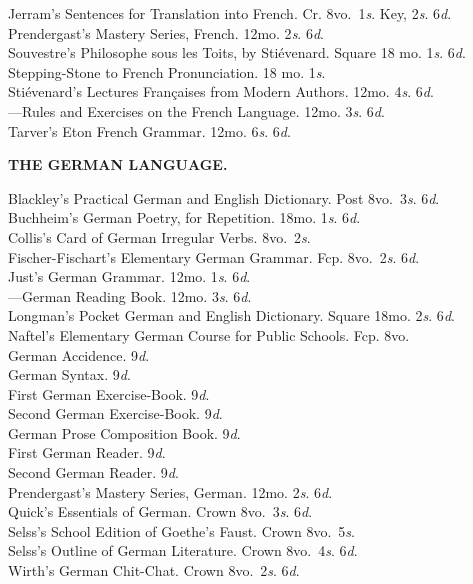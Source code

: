 \documentclass[letterpaper,12pt,oneside,openany]{memoir}
\newcommand{\D}{\hspace*{5mm}}
\newcommand{\E}{\hspace*{2mm}---\hspace*{2mm}}
\begin{document}
\begin{footnotesize}
Jerram's Sentences for Translation into French. Cr. 8vo.\ 1\textit{s}. Key, 2\textit{s}. 6\textit{d}.\\
Prendergast's Mastery Series, French. 12mo. 2\textit{s}. 6\textit{d}.\\
Souvestre's Philosophe sous les Toits, by Sti{\'e}venard. Square 18 mo. 1\textit{s}. 6\textit{d}.\\
Stepping-Stone to French Pronunciation. 18 mo. 1\textit{s}.\\
Sti{\'e}venard's Lectures Fran{\c c}aises from Modern Authors. 12mo. 4\textit{s}. 6\textit{d}.\\
\E Rules and Exercises on the French Language. 12mo. 3\textit{s}. 6\textit{d}.\\
Tarver's Eton French Grammar. 12mo. 6\textit{s}. 6\textit{d}.
\begin{center}
\textbf{THE GERMAN LANGUAGE.}
\end{center}
\raggedbottom
Blackley's Practical German and English Dictionary. Post 8vo.\ 3\textit{s}. 6\textit{d}.\\
Buchheim's German Poetry, for Repetition. 18mo. 1\textit{s}. 6\textit{d}.\\
Collis's Card of German Irregular Verbs. 8vo.\ 2\textit{s}.\\
Fischer-Fischart's Elementary German Grammar. Fcp. 8vo.\ 2\textit{s}. 6\textit{d}.\\
Just's German Grammar. 12mo. 1\textit{s}. 6\textit{d}.\\
\E German Reading Book. 12mo. 3\textit{s}. 6\textit{d}.\\
Longman's Pocket German and English Dictionary. Square 18mo. 2\textit{s}. 6\textit{d}.\\
Naftel's Elementary German Course for Public Schools. Fcp. 8vo.\\
\D German Accidence. 9\textit{d}.\\
\D German Syntax. 9\textit{d}.\\
\D First German Exercise-Book. 9\textit{d}.\\
\D Second German Exercise-Book. 9\textit{d}.\\
\D German Prose Composition Book. 9\textit{d}.\\
\D First German Reader. 9\textit{d}.\\
\D Second German Reader. 9\textit{d}.\\
Prendergast's Mastery Series, German. 12mo. 2\textit{s}. 6\textit{d}.\\
Quick's Essentials of German. Crown 8vo.\ 3\textit{s}. 6\textit{d}.\\
Selss's School Edition of Goethe's Faust. Crown 8vo.\ 5\textit{s}.\\
Selss's Outline of German Literature. Crown 8vo.\ 4\textit{s}. 6\textit{d}.\\
Wirth's German Chit-Chat. Crown 8vo.\ 2\textit{s}. 6\textit{d}.
\end{footnotesize}
\end{document}
